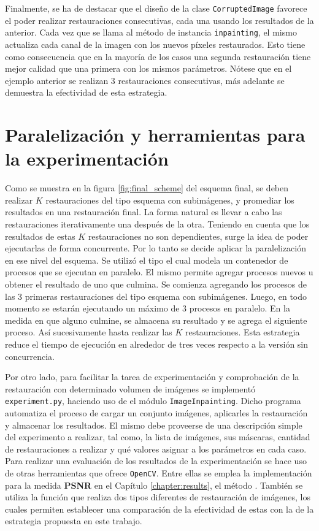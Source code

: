 Finalmente, se ha de destacar que el diseño de la clase \texttt{CorruptedImage} favorece el poder realizar restauraciones consecutivas, cada una usando los resultados de la anterior. Cada vez que se llama al m\'etodo de instancia \texttt{inpainting}, el mismo actualiza cada canal de la imagen con los nuevos p\'ixeles restaurados. Esto tiene como consecuencia que en la mayor\'ia de los casos una segunda restauraci\'on tiene mejor calidad que una primera con los mismos par\'ametros. N\'otese que en el ejemplo anterior se realizan 3 restauraciones consecutivas, m\'as adelante se demuestra la efectividad de esta estrategia.

\section{Paralelizaci\'on y herramientas para la experimentaci\'on}

Como se muestra en la figura \ref{fig:final_scheme} del esquema final, se deben realizar $K$ restauraciones del tipo esquema con subim\'agenes, y promediar los resultados en una restauraci\'on final. La forma natural es llevar a cabo las restauraciones iterativamente una despu\'es de la otra. Teniendo en cuenta que los resultados de estas $K$ restauraciones no son dependientes, surge la idea de poder ejecutarlas de forma concurrente. Por lo tanto se decide aplicar la paralelizaci\'on en ese nivel del esquema. Se utiliz\'o el tipo  el cual modela un contenedor de procesos que se ejecutan en paralelo. El mismo permite agregar procesos nuevos u obtener el resultado de uno que culmina. Se comienza agregando los procesos de las 3 primeras restauraciones del tipo esquema con subim\'agenes. Luego, en todo momento se estar\'an ejecutando un m\'aximo de 3 procesos en paralelo. En la medida en que alguno culmine, se almacena su resultado y se agrega el siguiente proceso. As\'i sucesivamente hasta realizar las $K$ restauraciones. Esta estrategia reduce el tiempo de ejecución en alrededor de tres veces respecto a la versión sin concurrencia.

Por otro lado, para facilitar la tarea de experimentaci\'on y comprobaci\'on de la restauraci\'on con determinado volumen de im\'agenes se implement\'o \texttt{experiment.py}, haciendo uso de el m\'odulo \texttt{ImageInpainting}. Dicho programa automatiza el proceso de cargar un conjunto im\'agenes, aplicarles la restauraci\'on y almacenar los resultados. El mismo debe proveerse de una descripci\'on simple del experimento a realizar, tal como, la lista de im\'agenes, sus m\'ascaras, cantidad de restauraciones a realizar y qu\'e valores asignar a los par\'ametros en cada caso. Para realizar una evaluaci\'on de los resultados de la experimentaci\'on se hace uso de otras herramientas que ofrece \texttt{OpenCV}. Entre ellas se emplea la implementaci\'on para la medida \textbf{PSNR} \cite{korhonen2012peak} en el Cap\'itulo \ref{chapter:results}, el m\'etodo . Tambi\'en se utiliza la funci\'on  que realiza dos tipos diferentes de restauraci\'on de im\'agenes, los cuales permiten establecer una comparación de la efectividad de estas con la de la estrategia  propuesta en este trabajo.